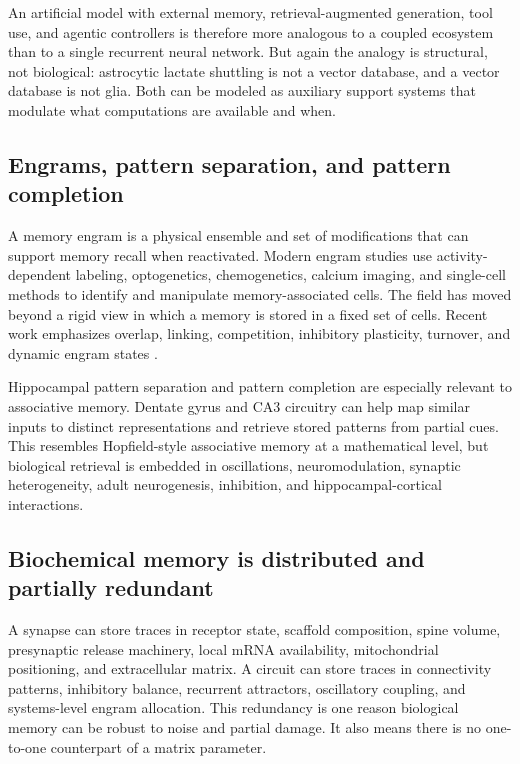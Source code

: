 \documentclass[11pt]{article}
\newcommand{\1}{\mathbf{1}}
\begin{document}
An artificial model with external memory, retrieval-augmented generation, tool use, and agentic controllers is therefore more analogous to a coupled ecosystem than to a single recurrent neural network. But again the analogy is structural, not biological: astrocytic lactate shuttling is not a vector database, and a vector database is not glia. Both can be modeled as auxiliary support systems that modulate what computations are available and when.

\subsection{Engrams, pattern separation, and pattern completion}

A memory engram is a physical ensemble and set of modifications that can support memory recall when reactivated. Modern engram studies use activity-dependent labeling, optogenetics, chemogenetics, calcium imaging, and single-cell methods to identify and manipulate memory-associated cells. The field has moved beyond a rigid view in which a memory is stored in a fixed set of cells. Recent work emphasizes overlap, linking, competition, inhibitory plasticity, turnover, and dynamic engram states \cite{Josselyn2015,Tonegawa2015,Choucry2024,Tome2024,Zaki2025,Eom2025,Sung2026}.

Hippocampal pattern separation and pattern completion are especially relevant to associative memory. Dentate gyrus and CA3 circuitry can help map similar inputs to distinct representations and retrieve stored patterns from partial cues. This resembles Hopfield-style associative memory at a mathematical level, but biological retrieval is embedded in oscillations, neuromodulation, synaptic heterogeneity, adult neurogenesis, inhibition, and hippocampal-cortical interactions.

\subsection{Biochemical memory is distributed and partially redundant}

A synapse can store traces in receptor state, scaffold composition, spine volume, presynaptic release machinery, local mRNA availability, mitochondrial positioning, and extracellular matrix. A circuit can store traces in connectivity patterns, inhibitory balance, recurrent attractors, oscillatory coupling, and systems-level engram allocation. This redundancy is one reason biological memory can be robust to noise and partial damage. It also means there is no one-to-one counterpart of a matrix parameter.
\end{document}
